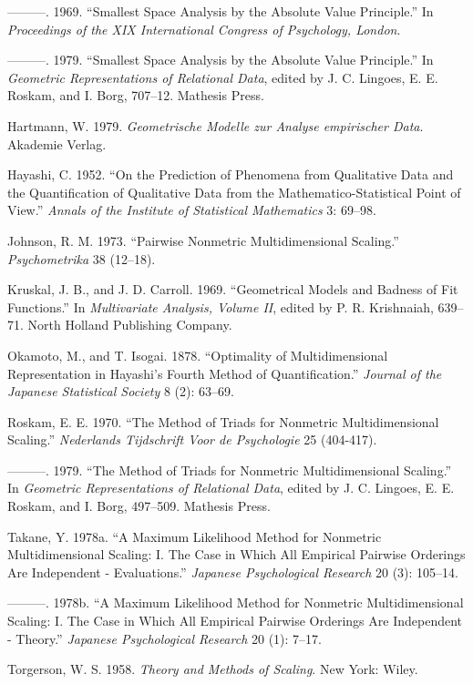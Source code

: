 \documentclass[
  12pt,
]{article}
\newlength{\cslhangindent}
\newenvironment{CSLReferences}[2] %
 {\begin{list}{}{%
  \setlength{\itemindent}{0pt}
  \setlength{\leftmargin}{0pt}
  \setlength{\parsep}{0pt}
  \ifodd #1
   \setlength{\leftmargin}{\cslhangindent}
   \setlength{\itemindent}{-1\cslhangindent}
  \fi
  \setlength{\itemsep}{#2\baselineskip}}}
 {\end{list}}
\begin{document}
\begin{CSLReferences}{1}{0}
---------. 1969. {``{Smallest Space Analysis by the Absolute Value Principle}.''} In \emph{{Proceedings of the XIX International Congress of Psychology, London}}.

---------. 1979. {``Smallest Space Analysis by the Absolute Value Principle.''} In \emph{{Geometric Representations of Relational Data}}, edited by J. C. Lingoes, E. E. Roskam, and I. Borg, 707--12. Mathesis Press.

Hartmann, W. 1979. \emph{{Geometrische Modelle zur Analyse empirischer Data}}. Akademie Verlag.

Hayashi, C. 1952. {``On the Prediction of Phenomena from Qualitative Data and the Quantification of Qualitative Data from the Mathematico-Statistical Point of View.''} \emph{Annals of the Institute of Statistical Mathematics} 3: 69--98.

Johnson, R. M. 1973. {``{Pairwise Nonmetric Multidimensional Scaling}.''} \emph{Psychometrika} 38 (12--18).

Kruskal, J. B., and J. D. Carroll. 1969. {``{Geometrical Models and Badness of Fit Functions}.''} In \emph{Multivariate Analysis, Volume II}, edited by P. R. Krishnaiah, 639--71. North Holland Publishing Company.

Okamoto, M., and T. Isogai. 1878. {``Optimality of Multidimensional Representation in Hayashi's Fourth Method of Quantification.''} \emph{Journal of the Japanese Statistical Society} 8 (2): 63--69.

Roskam, E. E. 1970. {``The Method of Triads for Nonmetric Multidimensional Scaling.''} \emph{Nederlands Tijdschrift Voor de Psychologie} 25 (404-417).

---------. 1979. {``The Method of Triads for Nonmetric Multidimensional Scaling.''} In \emph{{Geometric Representations of Relational Data}}, edited by J. C. Lingoes, E. E. Roskam, and I. Borg, 497--509. Mathesis Press.

Takane, Y. 1978a. {``A Maximum Likelihood Method for Nonmetric Multidimensional Scaling: I. The Case in Which All Empirical Pairwise Orderings Are Independent - Evaluations.''} \emph{Japanese Psychological Research} 20 (3): 105--14.

---------. 1978b. {``A Maximum Likelihood Method for Nonmetric Multidimensional Scaling: I. The Case in Which All Empirical Pairwise Orderings Are Independent - Theory.''} \emph{Japanese Psychological Research} 20 (1): 7--17.

Torgerson, W. S. 1958. \emph{{Theory and Methods of Scaling}}. New York: Wiley.

\end{CSLReferences}
\end{document}
